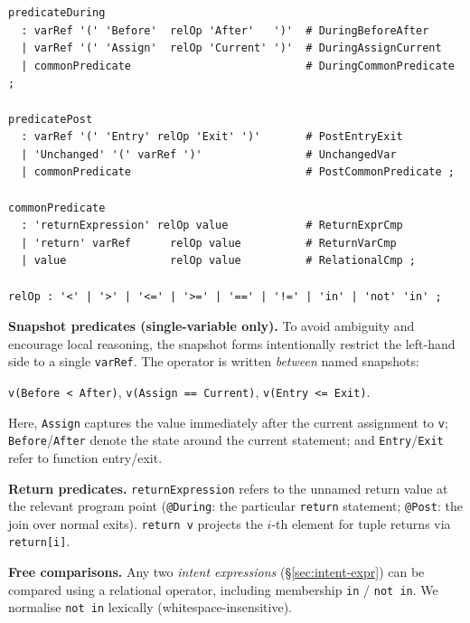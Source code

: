 \documentclass[10pt, conference]{IEEEtran}
\begin{document}
\begin{lstlisting}[basicstyle=\scriptsize\ttfamily,frame=single]
predicateDuring
  : varRef '(' 'Before'  relOp 'After'   ')'  # DuringBeforeAfter
  | varRef '(' 'Assign'  relOp 'Current' ')'  # DuringAssignCurrent
  | commonPredicate                           # DuringCommonPredicate ;

predicatePost
  : varRef '(' 'Entry' relOp 'Exit' ')'       # PostEntryExit
  | 'Unchanged' '(' varRef ')'                # UnchangedVar
  | commonPredicate                           # PostCommonPredicate ;

commonPredicate
  : 'returnExpression' relOp value            # ReturnExprCmp
  | 'return' varRef      relOp value          # ReturnVarCmp
  | value                relOp value          # RelationalCmp ;

relOp : '<' | '>' | '<=' | '>=' | '==' | '!=' | 'in' | 'not' 'in' ;
\end{lstlisting}

\noindent
\textbf{Snapshot predicates (single-variable only).}
To avoid ambiguity and encourage local reasoning, the snapshot
forms intentionally restrict the left-hand side to a single
\texttt{varRef}.  The operator is written \emph{between} named
snapshots:
\begin{center}
\verb|v(Before < After)|,\quad
\verb|v(Assign == Current)|,\quad
\verb|v(Entry <= Exit)|.
\end{center}
Here, \texttt{Assign} captures the value immediately after the
current assignment to \texttt{v}; \texttt{Before}/\texttt{After}
denote the state around the current statement; and
\texttt{Entry}/\texttt{Exit} refer to function entry/exit.

\noindent
\textbf{Return predicates.}
\verb|returnExpression| refers to the unnamed return value at the
relevant program point (\texttt{@During}: the particular \texttt{return}
statement; \texttt{@Post}: the join over normal exits).
\verb|return v| projects the $i$-th element for tuple returns via
\verb|return[i]|.

\noindent
\textbf{Free comparisons.}
Any two \emph{intent expressions} (\S\ref{sec:intent-expr}) can be
compared using a relational operator, including membership
\verb|in| / \verb|not in|.
We normalise \verb|not in| lexically (whitespace-insensitive).

\end{document}
